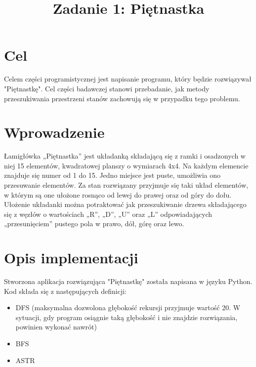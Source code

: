 \documentclass{classrep}
\author{
  \studentinfo{Marcin Giska}{242390} \and
  \studentinfo{Przemysław Musiał}{242473}
}
\title{Zadanie 1: Piętnastka}
\begin{document}
    \maketitle
    \thispagestyle{fancyplain}

    \section{Cel} {
    Celem części programistycznej jest napisanie programu, który będzie rozwiązywał "Piętnastkę". Cel części badawczej stanowi przebadanie, jak metody przeszukiwania przestrzeni stanów zachowują się w przypadku tego problemu.
    }

    \section{Wprowadzenie} {
    Łamigłówka „Piętnastka” jest układanką składającą się z ramki i osadzonych w niej 15 elementów, kwadratowej planszy o wymiarach 4x4. Na każdym elemencie znajduje się numer od 1 do 15. Jedno miejsce jest puste, umożliwia ono przesuwanie elementów. Za stan rozwiązany przyjmuje się taki układ elementów, w którym są one ułożone rosnąco od lewej do prawej oraz od góry do dołu. Ułożenie układanki można potraktować jak przeszukiwanie drzewa składającego się z węzłów o wartościach „R”, „D”, „U” oraz „L” odpowiadających „przesunięciem” pustego pola w prawo, dół, górę oraz lewo.
    }

    \section{Opis implementacji} {
    Stworzona aplikacja rozwiązująca "Piętnastkę" została napisana w języku Python. Kod składa się z następujących definicji:
        \begin{itemize}
            \item DFS (maksymalna dozwolona głębokość rekursji przyjmuje wartość 20. W sytuacji, gdy program osiągnie taką głębokość i nie znajdzie rozwiązania, powinien wykonać nawrót)
            \item BFS
            \item ASTR
        \end{itemize}
    }
\end{document}

